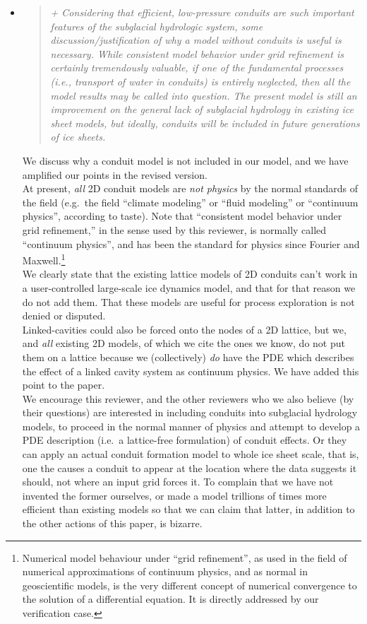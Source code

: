 \documentclass[11pt,reqno]{amsart}
\newcommand{\reply}[2]{
\medskip\medskip
\item  \begin{quote}
\emph{#1}
\end{quote}

\medskip
\noindent #2}
\begin{document}
\begin{itemize}
\reply{+ Considering that efficient, low-pressure conduits are such important features of the subglacial hydrologic system, some discussion/justification of why a model without conduits is useful is necessary.  While consistent model behavior under grid refinement is certainly tremendously valuable, if one of the fundamental processes (i.e., transport of water in conduits) is entirely neglected, then all the model results may be called into question.  The present model is still an improvement on the general lack of subglacial hydrology in existing ice sheet models, but ideally, conduits will be included in future generations of ice sheets.}
{We discuss why a conduit model is not included in our model, and we have amplified our points in the revised version.\\
\indent  At present, \emph{all} 2D conduit models are \emph{not physics} by the normal standards of the field (e.g.~the field ``climate modeling'' or ``fluid modeling'' or ``continuum physics'', according to taste).  Note that ``consistent model behavior under grid refinement,'' in the sense used by this reviewer, is normally called ``continuum physics'', and has been the standard for physics since Fourier and Maxwell.\footnote{Numerical model behaviour under ``grid refinement'', as used in the field of numerical approximations of continuum physics, and as normal in geoscientific models, is the very different concept of numerical convergence to the solution of a differential equation.  It is directly addressed by our verification case.} \\
\indent We clearly state that the existing lattice models of 2D conduits can't work in a user-controlled large-scale ice dynamics model, and that for that reason we do not add them.  That these models are useful for process exploration is not denied or disputed.\\
\indent Linked-cavities could also be forced onto the nodes of a 2D lattice, but we, and \emph{all} existing 2D models, of which we cite the ones we know, do not put them on a lattice because we (collectively) \emph{do} have the PDE which describes the effect of a linked cavity system as continuum physics.  We have added this point to the paper. \\
\indent We encourage this reviewer, and the other reviewers who we also believe (by their questions) are interested in including conduits into subglacial hydrology models, to proceed in the normal manner of physics and attempt to develop a PDE description (i.e.~a lattice-free formulation) of conduit effects.  Or they can apply an actual conduit formation model to whole ice sheet scale, that is, one the causes a conduit to appear at the location where the data suggests it should, not where an input grid forces it.  To complain that we have not invented the former ourselves, or made a model trillions of times more efficient than existing models so that we can claim that latter, in addition to the other actions of this paper, is bizarre.\\
}
\end{itemize}
\end{document}
